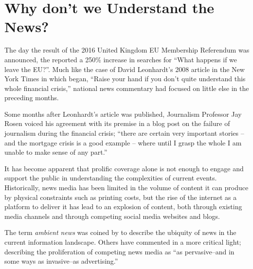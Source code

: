 \section{Why don't we Understand the News?}

The day the result of the 2016 United Kingdom EU Membership Referendum was announced, the \citeauthor{googletrends} reported a 250\% increase in searches for ``What happens if we leave the EU?''. Much like the case of David Leonhardt's 2008 article in the New York Times in which began, ``Raise your hand if you don't quite understand this whole financial crisis,'' national news commentary had focused on little else in the preceding months.

Some months after Leonhardt's article was published, Journalism Professor Jay Rosen voiced his agreement with its premise in a blog post on the failure of journalism during the financial crisis; ``there are certain very important stories -- and the mortgage crisis is a good example -- where until I grasp the whole I am unable to make sense of any part.''\citep{NationalExplainer} 

It has become apparent that prolific coverage alone is not enough to engage and support the public in understanding the complexities of current events. Historically, news media has been limited in the volume of content it can produce by physical constraints such as printing costs, but the rise of the internet as a platform to deliver it has lead to an explosion of content, both through existing media channels and through competing social media websites and blogs. 

The term \textit{ambient news} was coined by \citet{newnewsoldnews} to describe the ubiquity of news in the current information landscape. Others have commented in a more critical light; describing the proliferation of competing news media as ``as pervasive--and in some ways as invasive--as advertising.'' \citep[p.2]{overloadjournalismsbattle}


